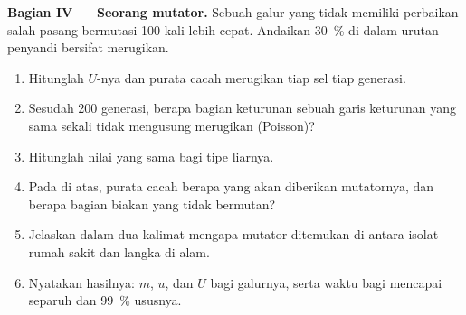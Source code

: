 \begin{problem}
\medskip
\noindent\textbf{Bagian IV --- Seorang mutator.}
Sebuah galur yang tidak memiliki perbaikan salah pasang bermutasi
\num{100} kali lebih cepat. Andaikan \qty{30}{\%}  di
dalam urutan penyandi bersifat merugikan.
\begin{enumerate}[resume]
  \item Hitunglah $U$-nya dan purata cacah  merugikan tiap
        sel tiap generasi.
  \item Sesudah \num{200} generasi, berapa bagian keturunan sebuah
        garis keturunan yang sama sekali tidak mengusung 
        merugikan (Poisson)?
  \item Hitunglah nilai yang sama bagi tipe liarnya.
  \item Pada  di atas, purata cacah berapa yang akan
        diberikan mutatornya, dan berapa bagian biakan yang tidak
        bermutan?
  \item Jelaskan dalam dua kalimat mengapa mutator ditemukan di antara
        isolat rumah sakit dan langka di alam.
  \item Nyatakan hasilnya: $m$, $u$, dan $U$ bagi galurnya, serta waktu
        bagi  mencapai separuh dan \qty{99}{\%} ususnya.
\end{enumerate}
\end{problem}
